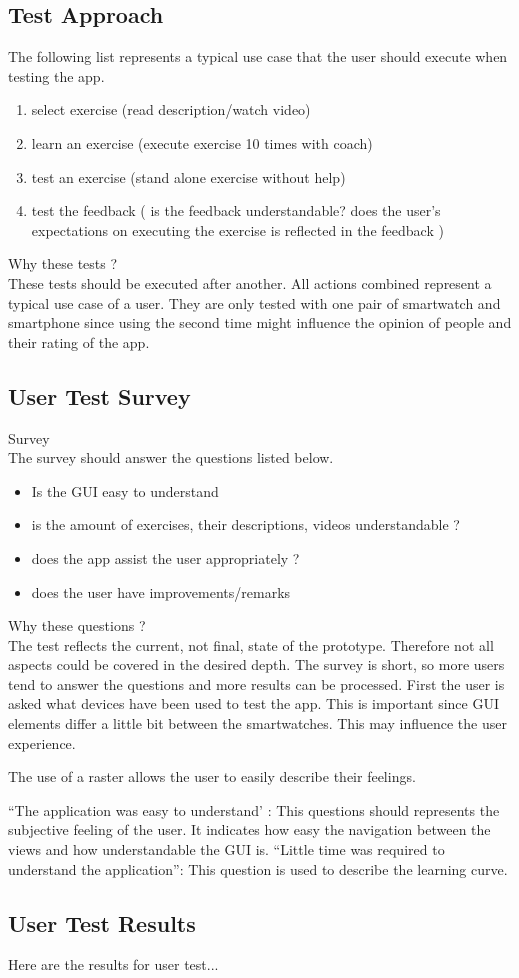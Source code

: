 \subsection{Test Approach}
The following list represents a typical use case that the user should execute when testing the app.

\begin{enumerate}
\item select exercise (read description/watch video)
\item learn an exercise (execute exercise 10 times with coach)
\item test an exercise (stand alone exercise without help)
\item test the feedback ( is the feedback understandable? does the user's expectations on executing the exercise is reflected in the feedback )
\end{enumerate}

Why these tests ? \\
These tests should be executed after another. All actions combined represent a typical use case of a user.
They are only tested with one pair of smartwatch and smartphone since using the second time might influence the opinion of people and their rating of the app.

\subsection{User Test Survey}
Survey\\
The survey should answer the questions listed below.
\begin{itemize}
\item Is the GUI easy to understand
\item is the amount of exercises, their descriptions, videos understandable ?
\item does the app assist the user appropriately ?
\item does the user have improvements/remarks
\end{itemize}

Why these questions ?\\
The test reflects the current, not final, state of the prototype. Therefore not all aspects could be covered in the desired depth.
The survey is short, so more users tend to answer the questions and more results can be processed.
First the user is asked what devices have been used to test the app. This is important since GUI elements differ a little bit between the smartwatches. This may influence the user experience.

The use of a raster allows the user to easily describe their feelings.

“The application was easy to understand’ : This questions should represents the subjective feeling of the user. It indicates how easy the navigation between the views  and how understandable the GUI is.
“Little time was required to understand the application”: This question is used to describe the learning curve.

\subsection{User Test Results}
Here are the results for user test...
